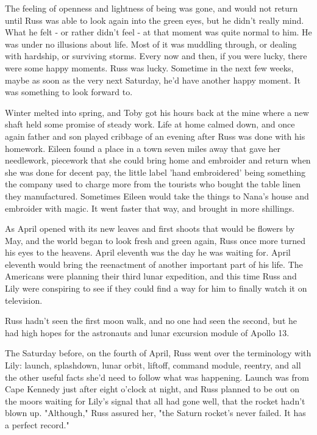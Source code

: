 \documentclass[a4paper,11pt]{article}
\begin{document}
The feeling of openness and lightness of being was gone, and would not return until Russ was able to look again into the green eyes, but he didn't really mind. What he felt - or rather didn't feel - at that moment was quite normal to him. He was under no illusions about life. Most of it was muddling through, or dealing with hardship, or surviving storms. Every now and then, if you were lucky, there were some happy moments. Russ was lucky. Sometime in the next few weeks, maybe as soon as the very next Saturday, he'd have another happy moment. It was something to look forward to.

Winter melted into spring, and Toby got his hours back at the mine where a new shaft held some promise of steady work. Life at home calmed down, and once again father and son played cribbage of an evening after Russ was done with his homework. Eileen found a place in a town seven miles away that gave her needlework, piecework that she could bring home and embroider and return when she was done for decent pay, the little label 'hand embroidered' being something the company used to charge more from the tourists who bought the table linen they manufactured. Sometimes Eileen would take the things to Nana's house and embroider with magic. It went faster that way, and brought in more shillings.

As April opened with its new leaves and first shoots that would be flowers by May, and the world began to look fresh and green again, Russ once more turned his eyes to the heavens. April eleventh was the day he was waiting for. April eleventh would bring the reenactment of another important part of his life. The Americans were planning their third lunar expedition, and this time Russ and Lily were conspiring to see if they could find a way for him to finally watch it on television.

Russ hadn't seen the first moon walk, and no one had seen the second, but he had high hopes for the astronauts and lunar excursion module of Apollo 13.

The Saturday before, on the fourth of April, Russ went over the terminology with Lily: launch, splashdown, lunar orbit, liftoff, command module, reentry, and all the other useful facts she'd need to follow what was happening. Launch was from Cape Kennedy just after eight o'clock at night, and Russ planned to be out on the moors waiting for Lily's signal that all had gone well, that the rocket hadn't blown up. "Although," Russ assured her, "the Saturn rocket's never failed. It has a perfect record."
\end{document}
